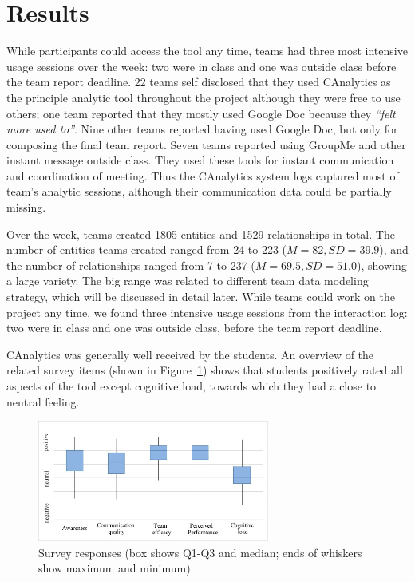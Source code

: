 \section{Results}\label{results}

While participants could access the tool any time, teams had three most
intensive usage sessions over the week: two were in class and one was outside
class before the team report deadline. 22 teams self disclosed that they used
CAnalytics as the principle analytic tool throughout the project although they
were free to use others; one team reported that they mostly used Google Doc
because they \emph{``felt more used to''}. Nine other teams reported having used
Google Doc, but only for composing the final team report. Seven teams reported
using GroupMe and other instant message outside class. They used these tools for
instant communication and coordination of meeting. Thus the CAnalytics system logs captured
most of team's analytic sessions, although their communication data could be
partially missing.

Over the week, teams created 1805 entities and 1529 relationships in
total. The number of entities teams created ranged from 24 to 223 ($M=82,
SD=39.9$), and the number of relationships ranged from 7 to 237 ($M=69.5,
SD=51.0$), showing a large variety. The big range was related to different team data modeling strategy,
which will be discussed in detail later. While teams could work on the project any time, we found three intensive usage sessions from the interaction log: two were in class and one was outside class, before the team report deadline.

CAnalytics was generally well received by the students. An overview of
the related survey items (shown in Figure~\ref{fig:survey}) shows that students positively rated all aspects
of the tool except cognitive load, towards which they had a close to neutral feeling. %

\begin{figure}
\centering
\includegraphics[width=3.00000in]{./img/survey_boxchart.jpg}
\caption{Survey responses (box shows Q1-Q3 and median; ends of whiskers show
maximum and minimum)\label{fig:survey}}
\end{figure}

